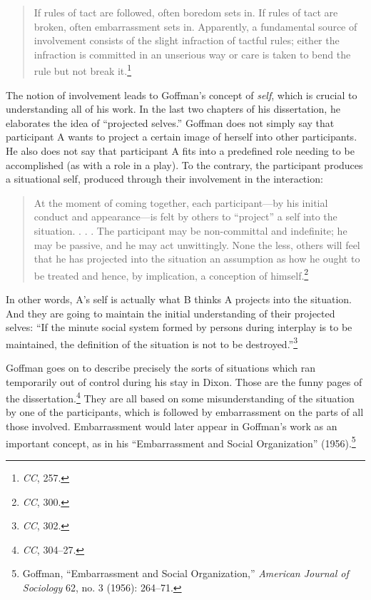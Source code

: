 \documentclass[twoside,symmetric,nobib,justified]{tufte-book}
\begin{document}
\begin{quote}
If rules of tact are followed, often boredom sets in. If rules of tact
are broken, often embarrassment sets in. Apparently, a fundamental
source of involvement consists of the slight infraction of tactful
rules; either the infraction is committed in an unserious way or care is
taken to bend the rule but not break it.\footnote{\emph{CC}, 257.}
\end{quote}

\noindent The notion of involvement leads to Goffman's concept of \emph{self},
which is crucial to understanding all of his work. In the last two
chapters of his dissertation, he elaborates the idea of ``projected
selves.'' Goffman does not simply say that participant A wants to
project a certain image of herself into other participants. He also does
not say that participant A fits into a predefined role needing to be
accomplished (as with a role in a play). To the contrary, the
participant produces a situational self, produced through their
involvement in the interaction:

\begin{quote}
At the moment of coming together, each participant---by his initial
conduct and appearance---is felt by others to ``project'' a self into
the situation. . . . The participant may be non-committal and
indefinite; he may be passive, and he may act unwittingly. None the
less, others will feel that he has projected into the situation an
assumption as how he ought to be treated and hence, by implication, a
conception of himself.\footnote{\emph{CC}, 300.}
\end{quote}

\noindent In other words, A's self is actually what B thinks A projects into the
situation. And they are going to maintain the initial understanding of
their projected selves: ``If the minute social system formed by persons
during interplay is to be maintained, the definition of the situation is
not to be destroyed.''\footnote{\emph{CC}, 302.}

Goffman goes on to describe precisely the sorts of situations which ran
temporarily out of control during his stay in Dixon. Those are the funny
pages of the dissertation.\footnote{\emph{CC}, 304--27.} They are all
based on some misunderstanding of the situation by one of the
participants, which is followed by embarrassment on the parts of all
those involved. Embarrassment would later appear in Goffman's work as an
important concept, as in his ``Embarrassment and Social Organization''
(1956).\footnote{Goffman, ``Embarrassment and Social Organization,''
  \emph{American Journal of Sociology} 62, no. 3 (1956): 264--71.}
\end{document}

